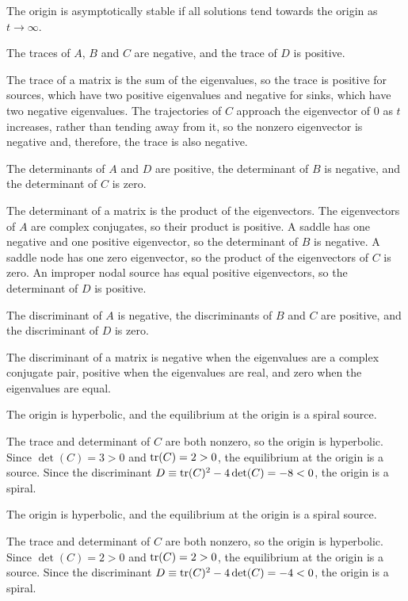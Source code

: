 \documentclass{ximera}
\begin{document}
\soln The origin is asymptotically stable if all solutions tend towards
the origin as $t \rightarrow \infty$.

 \ans The traces of $A$, $B$ and $C$ are negative, and the
trace of $D$ is positive.

\soln The trace of a matrix is the sum of the eigenvalues, so the trace
is positive for sources, which have two positive eigenvalues and
negative for sinks, which have two negative eigenvalues.  The trajectories
of $C$ approach the eigenvector of $0$ as $t$ increases, rather
than tending away from it, so the nonzero eigenvector is negative and,
therefore, the trace is also negative.

 \ans The determinants of $A$ and $D$ are positive, the
determinant of $B$ is negative, and the determinant of $C$ is zero.

\soln The determinant of a matrix is the product of the eigenvectors.  The
eigenvectors of $A$ are complex conjugates, so their product
is positive.  A saddle has one negative and one positive eigenvector, so
the determinant of $B$ is negative.  A saddle node has one zero
eigenvector, so the product of the eigenvectors of $C$ is zero.  An
improper nodal source has equal positive eigenvectors, so the determinant
of $D$ is positive.

 \ans The discriminant of $A$ is negative, the discriminants of
$B$ and $C$ are positive, and the discriminant of $D$ is zero.

\soln The discriminant of a matrix is negative when the eigenvalues are
a complex conjugate pair, positive when the eigenvalues are real, and
zero when the eigenvalues are equal.

 \ans The origin is hyperbolic, and the equilibrium at the origin
is a spiral source.

\soln The trace and determinant of $C$ are both nonzero, so the origin
is hyperbolic.  Since $\det(C) = 3 > 0$ and ${\rm tr}(C) = 2 > 0$,
the equilibrium at the origin is a source.  Since the discriminant
$D \equiv {\rm tr}(C)^2 - 4\det(C) = -8 < 0$, the origin is a spiral.

 \ans The origin is hyperbolic, and the equilibrium at the origin
is a spiral source.

\soln The trace and determinant of $C$ are both nonzero, so the origin
is hyperbolic.  Since $\det(C) = 2 > 0$ and ${\rm tr}(C) = 2 > 0$,
the equilibrium at the origin is a source.  Since the discriminant
$D \equiv {\rm tr}(C)^2 - 4\det(C) = -4 < 0$, the origin is a spiral.
\end{document}
